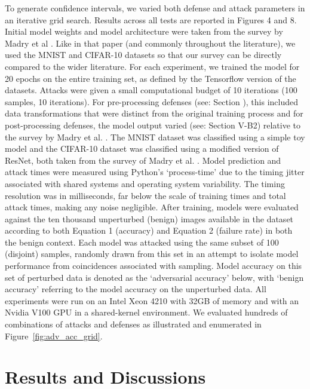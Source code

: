 \documentclass[journal]{IEEEtran}
\begin{document}
To generate confidence intervals, we varied both defense and attack parameters in an iterative grid search. Results across all tests are reported in Figures 4 and 8. Initial model weights and model architecture were taken from the survey by Madry et al \cite{madry2017towards}. Like in that paper (and commonly throughout the literature), we used the MNIST and CIFAR-10 datasets so that our survey can be directly compared to the wider literature. For each experiment, we trained the model for 20 epochs on the entire training set, as defined by the Tensorflow version of the datasets. Attacks were given a small computational budget of 10 iterations (100 samples, 10 iterations). For pre-processing defenses (see: Section \label{preprocessing}), this included data transformations that were distinct from the original training process and for post-processing defenses, the model output varied (see: Section V-B2) relative to the survey by Madry et al. \cite{madry2017towards}. The MNIST dataset was classified using a simple toy model and the CIFAR-10 dataset was classified using a modified  version of ResNet, both taken from the survey of Madry et al. \cite{madry2017towards}. Model prediction and attack times were measured using Python’s ‘process-time’ due to the timing jitter associated with shared systems and operating system variability. The timing resolution was in milliseconds, far below the scale of training times and total attack times, making
any noise negligible. After training, models were evaluated against the ten thousand unperturbed (benign) images available in the dataset according to both Equation 1 (accuracy) and
Equation 2 (failure rate) in both the benign context. Each model was attacked using the same subset of 100 (disjoint) samples, randomly drawn from this set in an attempt to isolate model performance from coincidences associated with sampling. Model accuracy on this set of perturbed data is denoted as the ‘adversarial accuracy’ below, with ‘benign accuracy’ referring to the model accuracy on the unperturbed data. All experiments were run on an Intel Xeon 4210 with 32GB of memory and with an Nvidia V100 GPU in a shared-kernel environment. We evaluated hundreds of combinations of attacks and defenses as illustrated and enumerated in Figure~\ref{fig:adv_acc_grid}.






\section{Results and Discussions}
\label{results}
\end{document}
